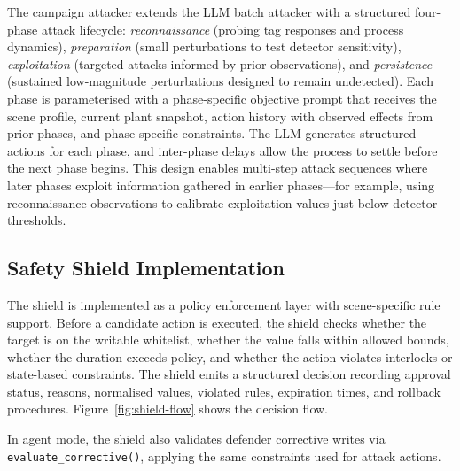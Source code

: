 The campaign attacker extends the LLM batch attacker with a structured four-phase attack lifecycle: \emph{reconnaissance} (probing tag responses and process dynamics), \emph{preparation} (small perturbations to test detector sensitivity), \emph{exploitation} (targeted attacks informed by prior observations), and \emph{persistence} (sustained low-magnitude perturbations designed to remain undetected). Each phase is parameterised with a phase-specific objective prompt that receives the scene profile, current plant snapshot, action history with observed effects from prior phases, and phase-specific constraints. The LLM generates structured actions for each phase, and inter-phase delays allow the process to settle before the next phase begins. This design enables multi-step attack sequences where later phases exploit information gathered in earlier phases---for example, using reconnaissance observations to calibrate exploitation values just below detector thresholds.

\subsection{Safety Shield Implementation}

The shield is implemented as a policy enforcement layer with scene-specific rule support. Before a candidate action is executed, the shield checks whether the target is on the writable whitelist, whether the value falls within allowed bounds, whether the duration exceeds policy, and whether the action violates interlocks or state-based constraints. The shield emits a structured decision recording approval status, reasons, normalised values, violated rules, expiration times, and rollback procedures. Figure~\ref{fig:shield-flow} shows the decision flow.

In agent mode, the shield also validates defender corrective writes via \texttt{evaluate\_corrective()}, applying the same constraints used for attack actions.

